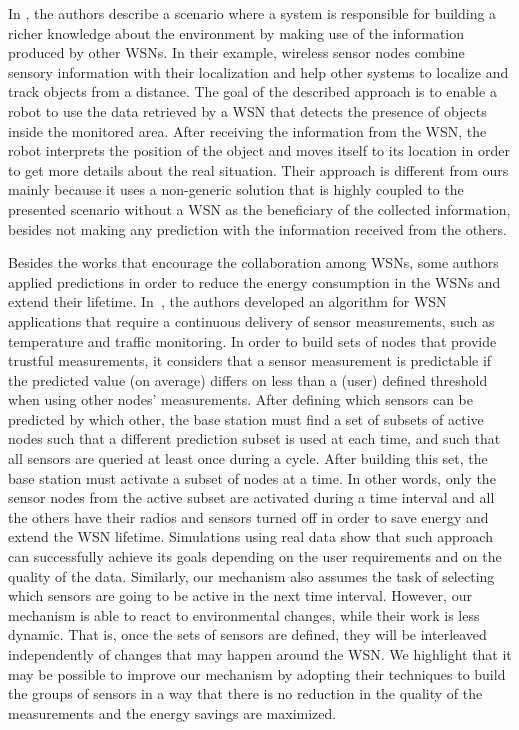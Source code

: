 \documentclass{llncs}
\begin{document}
In \cite{Parker2008}, the authors describe a scenario where a system 
is responsible for building a richer knowledge about the environment by making 
use of the information produced by other WSNs. In their example, wireless 
sensor nodes combine sensory information with their localization and help 
other systems to localize and track objects from a distance. The goal of the 
described approach is to enable a robot to use the data retrieved by a WSN that 
detects the presence of objects inside the monitored area. After receiving the 
information from the WSN, the robot interprets the position of the object and 
moves itself to its location in order to get more details about the real 
situation. Their approach is different from ours mainly because it uses a 
non-generic solution that is highly coupled to the presented scenario without a 
WSN as the beneficiary of the collected information, besides not making any 
prediction with the information received from the others.

Besides the works that encourage the collaboration among WSNs, some authors 
applied predictions in order to reduce the energy consumption in the WSNs and 
extend their lifetime.
In~\cite{Yann-Ael2005}, the authors developed an algorithm for WSN applications 
that require a continuous delivery of sensor measurements, such as temperature 
and traffic monitoring. In order to build sets of nodes that provide trustful 
measurements, it considers that a sensor measurement is predictable if the 
predicted value (on average) differs on less than a (user) defined threshold 
when using other nodes' measurements.
After defining which sensors can be predicted by which other, the base station 
must find a set of subsets of active nodes such that a different prediction 
subset is used at each time, and such that all sensors are queried at least once 
during a cycle. 
After building this set, the base station must activate a subset of nodes at a 
time. In other words, only the sensor nodes from the active subset are activated 
during a time interval and all the others have their radios and sensors turned 
off in order to save energy and extend the WSN lifetime.
Simulations using real data show that such approach can successfully achieve 
its goals depending on the user requirements and on the quality of the data.
Similarly, our mechanism also assumes the task of selecting which sensors are 
going to be active in the next time interval. 
However, our mechanism is able to react to environmental changes, while their 
work is less dynamic. That is, once the sets of sensors are defined, they will 
be interleaved independently of changes that may happen around the WSN. 
We highlight that it may be possible to improve our mechanism by adopting their 
techniques to build the groups of sensors in a way that there is no reduction in 
the quality of the measurements and the energy savings are maximized.
\end{document}
